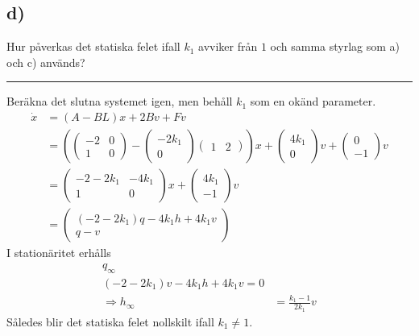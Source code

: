 \documentclass[12pt]{article}
\newcommand{\qline}{\hrule \vspace*{10pt}}
\begin{document}
\subsection*{d)}
Hur påverkas det statiska felet ifall $k_1$ avviker från $1$ och samma styrlag som a) och c) används?
\qline
Beräkna det slutna systemet igen, men behåll $k_1$ som en okänd parameter.
\begin{align*}
  \dot{x} &= (A-BL)x + 2Bv + Fv \\
  &= 
    \left(
    \begin{pmatrix}
-2 & 0 \\
1 & 0
    \end{pmatrix} - \begin{pmatrix}
-2k_1 \\
0
    \end{pmatrix}\begin{pmatrix}
1 & 2
    \end{pmatrix}
    \right)x + \begin{pmatrix}
4k_1 \\
0
    \end{pmatrix}v + \begin{pmatrix}
0 \\
-1
    \end{pmatrix}v \\
&= \begin{pmatrix}
-2-2k_1 & -4k_1 \\
1 & 0
\end{pmatrix}x + \begin{pmatrix}
4k_1 \\
-1
\end{pmatrix}v \\
&= \begin{pmatrix}
(-2-2k_1)q - 4k_1h + 4k_1v \\
q-v
\end{pmatrix}
\end{align*}
I stationäritet erhålls
\begin{align*}
  q_{\infty} \\
  (-2-2k_1)v-4k_1h+4k_1v = 0 \\
  \Rightarrow h_{\infty} &= \frac{k_1-1}{2k_1}v
\end{align*}
Således blir det statiska felet nollskilt ifall $k_1 \neq 1$.
\end{document}
